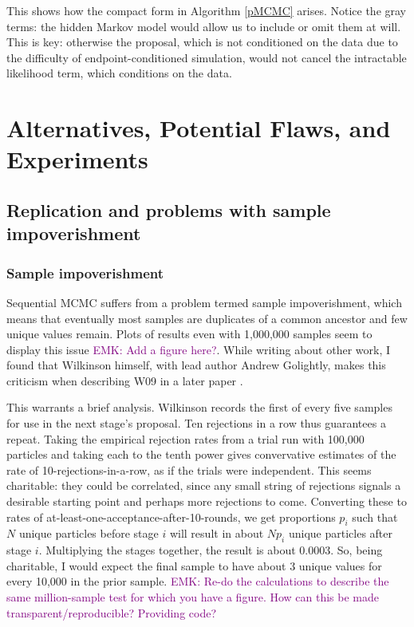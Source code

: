 \documentclass{article}
\newcommand\EMK[1]{\textcolor{purple}{EMK: #1}}
\begin{document}
This shows how the compact form in Algorithm \ref{pMCMC} arises. Notice the gray terms: the hidden Markov model would allow us to include or omit them at will. This is key: otherwise the proposal, which is not conditioned on the data due to the difficulty of endpoint-conditioned simulation, would not cancel the intractable likelihood term, which conditions on the data. %

\section{Alternatives, Potential Flaws, and Experiments}
\subsection{Replication and problems with sample impoverishment}

\subsubsection{Sample impoverishment}
Sequential MCMC suffers from a problem termed sample impoverishment, which means that eventually most samples are duplicates of a common ancestor and few unique values remain. Plots of results even with 1,000,000 samples seem to display this issue \EMK{Add a figure here?}. While writing about other work, I found that Wilkinson himself, with lead author Andrew Golightly, makes this criticism when describing W09 in a later paper \cite{golightly2011bayesian}. 

This warrants a brief analysis. Wilkinson records the first of every five samples for use in the next stage's proposal. Ten rejections in a row thus guarantees a repeat. Taking the empirical rejection rates from a trial run with 100,000 particles and taking each to the tenth power gives convervative estimates of the rate of 10-rejections-in-a-row, as if the trials were independent. This seems charitable: they could be correlated, since any small string of rejections signals a desirable starting point and perhaps more rejections to come. Converting these to rates of at-least-one-acceptance-after-10-rounds, we get proportions $p_i$ such that $N$ unique particles before stage $i$ will result in about $Np_i$ unique particles after stage $i$. Multiplying the stages together, the result is about 0.0003. So, being charitable, I would expect the final sample to have about 3 unique values for every 10,000 in the prior sample. \EMK{Re-do the calculations to describe the same million-sample test for which you have a figure. How can this be made transparent/reproducible? Providing code?}
\end{document}
